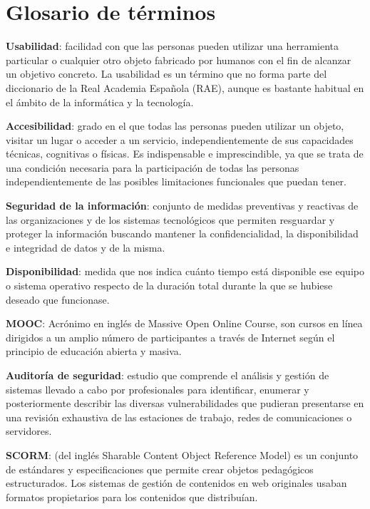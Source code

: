 \chapter{Glosario de términos}

\textbf{Usabilidad}: facilidad con que las personas pueden utilizar una herramienta particular o cualquier otro objeto fabricado por humanos con el fin de alcanzar un objetivo concreto. La usabilidad es un término que no forma parte del diccionario de la Real Academia Española (RAE), aunque es bastante habitual en el ámbito de la informática y la tecnología.
\bigskip

\textbf{Accesibilidad}: grado en el que todas las personas pueden utilizar un objeto, visitar un lugar o acceder a un servicio, independientemente de sus capacidades técnicas, cognitivas o físicas. Es indispensable e imprescindible, ya que se trata de una condición necesaria para la participación de todas las personas independientemente de las posibles limitaciones funcionales que puedan tener.
\bigskip

\textbf{Seguridad de la información}: conjunto de medidas preventivas y reactivas de las organizaciones y de los sistemas tecnológicos que permiten resguardar y proteger la información buscando mantener la confidencialidad, la disponibilidad e integridad de datos y de la misma.
\bigskip

\textbf{Disponibilidad}: medida que nos indica cuánto tiempo está disponible ese equipo o sistema operativo respecto de la duración total durante la que se hubiese deseado que funcionase.
\bigskip


\textbf{MOOC}: Acrónimo en inglés de Massive Open Online Course, son cursos en línea dirigidos a un amplio número de participantes a través de Internet según el principio de educación abierta y masiva.
\bigskip

 \textbf{Auditoría de seguridad}: estudio que comprende el análisis y gestión de sistemas llevado a cabo por profesionales para identificar, enumerar y posteriormente describir las diversas vulnerabilidades que pudieran presentarse en una revisión exhaustiva de las estaciones de trabajo, redes de comunicaciones o servidores.
\bigskip


\textbf{SCORM}: (del inglés Sharable Content Object Reference Model) es un conjunto de estándares y especificaciones que permite crear objetos pedagógicos estructurados. Los sistemas de gestión de contenidos en web originales usaban formatos propietarios para los contenidos que distribuían.
\bigskip


